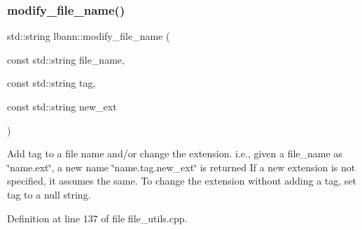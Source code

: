 \subsubsection{\texorpdfstring{modify\+\_\+file\+\_\+name()}{modify\_file\_name()}}
{\footnotesize\ttfamily std\+::string lbann\+::modify\+\_\+file\+\_\+name (\begin{DoxyParamCaption}\item[{const std\+::string}]{file\+\_\+name,  }\item[{const std\+::string}]{tag,  }\item[{const std\+::string}]{new\+\_\+ext }\end{DoxyParamCaption})}

Add tag to a file name and/or change the extension. i.\+e., given a file\+\_\+name as \char`\"{}name.\+ext\char`\"{}, a new name \char`\"{}name.\+tag.\+new\+\_\+ext\char`\"{} is returned If a new extension is not specified, it assumes the same. To change the extension without adding a tag, set tag to a null string. 

Definition at line 137 of file file\+\_\+utils.\+cpp.


